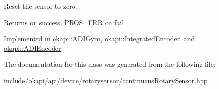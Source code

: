 Reset the sensor to zero.

\begin{DoxyReturn}{Returns}
{} on success, {\ttfamily P\+R\+O\+S\+\_\+\+E\+RR} on fail 
\end{DoxyReturn}


Implemented in \mbox{\hyperlink{classokapi_1_1ADIGyro_a316eec0bf6008c50fea6d1a621fd2e87}{okapi\+::\+A\+D\+I\+Gyro}}, \mbox{\hyperlink{classokapi_1_1IntegratedEncoder_a1f95f00f59911a87a9a38633343f4311}{okapi\+::\+Integrated\+Encoder}}, and \mbox{\hyperlink{classokapi_1_1ADIEncoder_a8df70f75e1f23aa03eaa3e331fcab381}{okapi\+::\+A\+D\+I\+Encoder}}.



The documentation for this class was generated from the following file\+:\begin{DoxyCompactItemize}
\item 
include/okapi/api/device/rotarysensor/\mbox{\hyperlink{continuousRotarySensor_8hpp}{continuous\+Rotary\+Sensor.\+hpp}}\end{DoxyCompactItemize}
